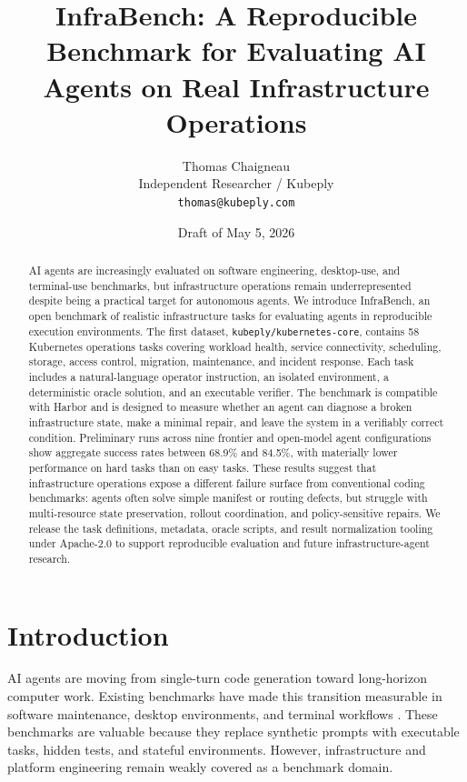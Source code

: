 \documentclass[11pt]{article}
\title{InfraBench: A Reproducible Benchmark for Evaluating AI Agents on Real Infrastructure Operations}
\author{
Thomas Chaigneau\\
Independent Researcher / Kubeply\\
\texttt{thomas@kubeply.com}
}
\date{Draft of May 5, 2026}
\begin{document}
\maketitle

\begin{abstract}
AI agents are increasingly evaluated on software engineering, desktop-use, and
terminal-use benchmarks, but infrastructure operations remain underrepresented
despite being a practical target for autonomous agents. We introduce
InfraBench, an open benchmark of realistic infrastructure tasks for evaluating
agents in reproducible execution environments. The first dataset,
\texttt{kubeply/kubernetes-core}, contains 58 Kubernetes operations tasks
covering workload health, service connectivity, scheduling, storage, access
control, migration, maintenance, and incident response. Each task includes a
natural-language operator instruction, an isolated environment, a deterministic
oracle solution, and an executable verifier. The benchmark is compatible with
Harbor and is designed to measure whether an agent can diagnose a broken
infrastructure state, make a minimal repair, and leave the system in a
verifiably correct condition. Preliminary runs across nine frontier and
open-model agent configurations show aggregate success rates between 68.9\%
and 84.5\%, with materially lower performance on hard tasks than on easy tasks.
These results suggest that infrastructure operations expose a different failure
surface from conventional coding benchmarks: agents often solve simple manifest
or routing defects, but struggle with multi-resource state preservation,
rollout coordination, and policy-sensitive repairs. We release the task
definitions, metadata, oracle scripts, and result normalization tooling under
Apache-2.0 to support reproducible evaluation and future infrastructure-agent
research.
\end{abstract}

\section{Introduction}

AI agents are moving from single-turn code generation toward long-horizon
computer work. Existing benchmarks have made this transition measurable in
software maintenance, desktop environments, and terminal workflows
\cite{jimenez2024swebench,xie2024osworld,merrill2026terminalbench}. These
benchmarks are valuable because they replace synthetic prompts with executable
tasks, hidden tests, and stateful environments. However, infrastructure and
platform engineering remain weakly covered as a benchmark domain.
\end{document}
